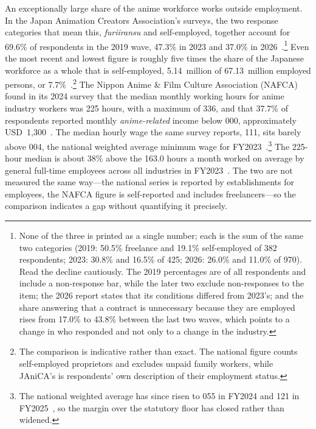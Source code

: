 An exceptionally large share of the anime workforce works outside employment. In the
Japan Animation Creators Association's surveys, the two response categories that mean
this, \emph{furiiransu} and self-employed, together account for 69.6\% of respondents
in the 2019 wave, 47.3\% in 2023 and 37.0\% in
2026~\cite{janica2019survey,janica2023survey,janica2026survey}.\footnote{None of the
three is printed as a single number; each is the sum of the same two categories
(2019: 50.5\% freelance and 19.1\% self-employed of 382 respondents; 2023: 30.8\% and
16.5\% of 425; 2026: 26.0\% and 11.0\% of 970). Read the decline cautiously. The 2019
percentages are of all respondents and include a non-response bar, while the later two
exclude non-responses to the item; the 2026 report states that its conditions differed
from 2023's; and the share answering that a contract is unnecessary because they are
employed rises from 17.0\% to 43.8\% between the last two waves, which points to a
change in who responded and not only to a change in the industry.} Even the most recent
and lowest figure is roughly five times the share of the Japanese workforce as a whole
that is self-employed, 5.14~million of 67.13~million employed persons, or
7.7\%~\cite{mic2023labourforce}.\footnote{The comparison is indicative rather than
exact. The national figure counts self-employed proprietors and excludes unpaid family
workers, while JAniCA's is respondents' own description of their employment status.}
The Nippon Anime \& Film Culture Association (NAFCA) found in its 2024 survey that
the median monthly working hours for anime industry workers was 225 hours, with a
maximum of 336, and that 37.7\% of respondents reported monthly \emph{anime-related}
income below 000, approximately USD~1{,}300~\cite{nafca2024survey}.
The median hourly wage the same survey reports, 111, sits barely above
004, the national weighted average minimum wage for
FY2023~\cite{mhlw2025minwage}.\footnote{The national weighted average has since risen
to 055 in FY2024 and 121 in FY2025~\cite{mhlw2025minwage},
so the margin over the statutory floor has closed rather than widened.}
The 225-hour median is about 38\% above the 163.0 hours a month worked on average by
general full-time employees across all industries in FY2023~\cite{mhlw2024monthly}.
The two are not measured the same way---the national series is reported by
establishments for employees, the NAFCA figure is self-reported and includes
freelancers---so the comparison indicates a gap without quantifying it precisely.

